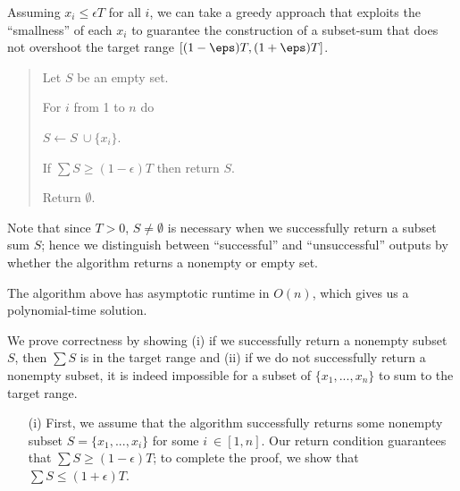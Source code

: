 \documentclass{article}
\begin{document}
\begin{solution}
Assuming \( x_i \leq \epsilon T \) for all \( i \), we can take a greedy approach that exploits the ``smallness'' of each \( x_i \) to guarantee the construction of a subset-sum that does not overshoot the target range \( [( 1-\eps )T , ( 1+\eps )T ] \).

\begin{quote}%

\begin{steps}
    \item Let \( S \) be an empty set.
    \item For \( i \) from 1 to \( n \) do
    \begin{steps}
        \item \( S \leftarrow S \ \cup \{x_i\} \).
        \item If \( \sum S \geq (1 - \epsilon) T \) then return \( S \).
    \end{steps}
    \item Return \( \emptyset \).
\end{steps}
\end{quote}
Note that since \( T > 0 \), \( S \not= \emptyset \) is necessary when we successfully return a subset sum \( S \); hence we distinguish between ``successful'' and ``unsuccessful'' outputs by whether the algorithm returns a nonempty or empty set.

\begin{subproof} [Runtime]
The algorithm above has asymptotic runtime in \( O(n) \), which gives us a polynomial-time solution.
\end{subproof}

\vspace{-0.7cc}
\begin{subproof} [Correctness]
We prove correctness by showing (i) if we successfully return a nonempty subset \( S \), then \( \sum S \) is in the target range and (ii) if we do not successfully return a nonempty subset, it is indeed impossible for a subset of \( \{x_1, ..., x_n\} \) to sum to the target range.
\begin{enumerate}
    \item [(i)] First, we assume that the algorithm successfully returns some nonempty subset \( S = \{x_1, ..., x_i\} \) for some \( i \ \in [1,n] \). Our return condition guarantees that \( \sum S \geq (1 - \epsilon) T \); to complete the proof, we show that \( \sum S \leq (1 + \epsilon) T \).


\end{enumerate}
\end{subproof}
\end{solution}
\end{document}
